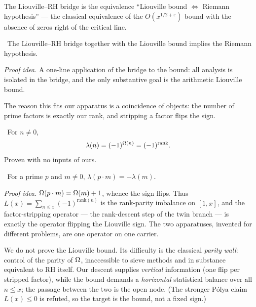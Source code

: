 \begin{definition}\label{def:LiouvilleRHBridge}
The Liouville--RH bridge is the equivalence ``Liouville bound $\iff$ Riemann hypothesis'' --- the
classical equivalence of the $O(x^{1/2+\varepsilon})$ bound with the absence of zeros right of the
critical line. \red{} 
\end{definition}

\begin{theorem}\label{thm:riemann_of_liouville_bound}
\green{}\ The Liouville--RH bridge together with the Liouville bound implies the Riemann hypothesis.
\end{theorem}

\emph{Proof idea.} A one-line application of the bridge to the bound: all analysis is isolated in the
bridge, and the only substantive goal is the arithmetic Liouville bound.

The reason this fits our apparatus is a coincidence of objects: the number of prime factors is
exactly our rank, and stripping a factor flips the sign.

\begin{theorem}\label{thm:liouville_eq_neg_one_pow_rank}
\green{}\ For $n\ne0$,
\begin{equation}\label{eq:liouville-rank}
  \lambda(n) = (-1)^{\Omega(n)} = (-1)^{\mathrm{rank}} .
\end{equation}
Proven with no inputs of ours. 
\end{theorem}

\begin{theorem}\label{thm:liouville_flip_of_mul_prime}
\green{}\ For a prime $p$ and $m\ne0$, $\lambda(p\cdot m) = -\lambda(m)$.
\end{theorem}

\emph{Proof idea.} $\Omega(p\cdot m) = \Omega(m)+1$, whence the sign flips. Thus
$L(x) = \sum_{n\le x}(-1)^{\mathrm{rank}(n)}$ is the rank-parity imbalance on $[1,x]$, and the
factor-stripping operator --- the rank-descent step of the twin branch --- is exactly the operator
flipping the Liouville sign. The two apparatuses, invented for different problems, are one operator
on one carrier.

We do not prove the Liouville bound. Its difficulty is the classical \emph{parity wall}: control of
the parity of $\Omega$, inaccessible to sieve methods and in substance equivalent to RH itself. Our
descent supplies \emph{vertical} information (one flip per stripped factor), while the bound demands
a \emph{horizontal} statistical balance over all $n\le x$; the passage between the two is the open
node. (The stronger P\'olya claim $L(x)\le0$ is refuted, so the target is the bound, not a fixed
sign.)

